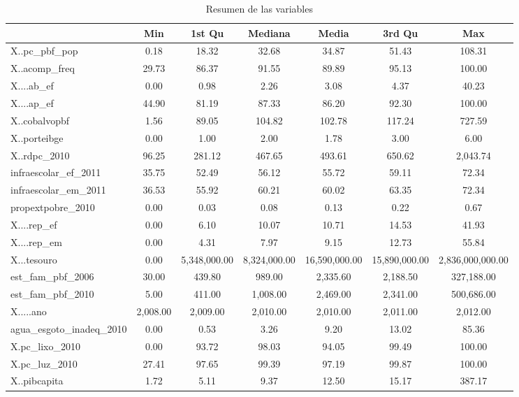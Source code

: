 \documentclass[
]{article}
\begin{document}
\begin{table}[!h]

\caption{\label{tab:unnamed-chunk-3}Resumen de las variables}
\centering
\fontsize{8}{10}\selectfont
\begin{tabular}[t]{lcccccc}
\toprule
  & Min & 1st Qu & Mediana & Media & 3rd Qu & Max\\
\midrule
X..pc\_pbf\_pop & 0.18 & 18.32 & 32.68 & 34.87 & 51.43 & 108.31\\
X..acomp\_freq & 29.73 & 86.37 & 91.55 & 89.89 & 95.13 & 100.00\\
X....ab\_ef & 0.00 & 0.98 & 2.26 & 3.08 & 4.37 & 40.23\\
X....ap\_ef & 44.90 & 81.19 & 87.33 & 86.20 & 92.30 & 100.00\\
X..cobalvopbf & 1.56 & 89.05 & 104.82 & 102.78 & 117.24 & 727.59\\
\addlinespace
X..porteibge & 0.00 & 1.00 & 2.00 & 1.78 & 3.00 & 6.00\\
X..rdpc\_2010 & 96.25 & 281.12 & 467.65 & 493.61 & 650.62 & 2,043.74\\
infraescolar\_ef\_2011 & 35.75 & 52.49 & 56.12 & 55.72 & 59.11 & 72.34\\
infraescolar\_em\_2011 & 36.53 & 55.92 & 60.21 & 60.02 & 63.35 & 72.34\\
propextpobre\_2010 & 0.00 & 0.03 & 0.08 & 0.13 & 0.22 & 0.67\\
\addlinespace
X....rep\_ef & 0.00 & 6.10 & 10.07 & 10.71 & 14.53 & 41.93\\
X....rep\_em & 0.00 & 4.31 & 7.97 & 9.15 & 12.73 & 55.84\\
X...tesouro & 0.00 & 5,348,000.00 & 8,324,000.00 & 16,590,000.00 & 15,890,000.00 & 2,836,000,000.00\\
est\_fam\_pbf\_2006 & 30.00 & 439.80 & 989.00 & 2,335.60 & 2,188.50 & 327,188.00\\
est\_fam\_pbf\_2010 & 5.00 & 411.00 & 1,008.00 & 2,469.00 & 2,341.00 & 500,686.00\\
\addlinespace
X.....ano & 2,008.00 & 2,009.00 & 2,010.00 & 2,010.00 & 2,011.00 & 2,012.00\\
agua\_esgoto\_inadeq\_2010 & 0.00 & 0.53 & 3.26 & 9.20 & 13.02 & 85.36\\
X.pc\_lixo\_2010 & 0.00 & 93.72 & 98.03 & 94.05 & 99.49 & 100.00\\
X.pc\_luz\_2010 & 27.41 & 97.65 & 99.39 & 97.19 & 99.87 & 100.00\\
X..pibcapita & 1.72 & 5.11 & 9.37 & 12.50 & 15.17 & 387.17\\

\end{tabular}
\end{table}
\end{document}
